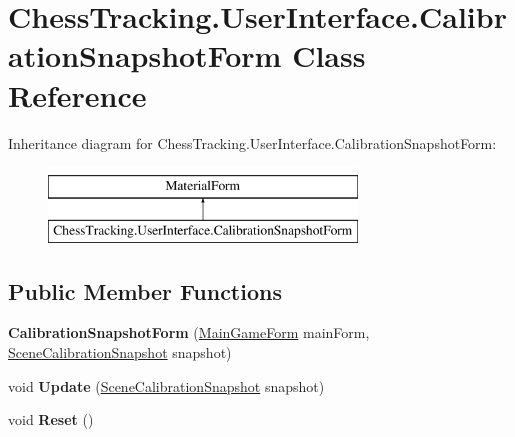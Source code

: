 \hypertarget{class_chess_tracking_1_1_user_interface_1_1_calibration_snapshot_form}{}\section{Chess\+Tracking.\+User\+Interface.\+Calibration\+Snapshot\+Form Class Reference}
\label{class_chess_tracking_1_1_user_interface_1_1_calibration_snapshot_form}
Inheritance diagram for Chess\+Tracking.\+User\+Interface.\+Calibration\+Snapshot\+Form\+:\begin{figure}[H]
\begin{center}
\leavevmode
\includegraphics[height=2.000000cm]{class_chess_tracking_1_1_user_interface_1_1_calibration_snapshot_form}
\end{center}
\end{figure}
\subsection*{Public Member Functions}
\begin{DoxyCompactItemize}
\item 
\mbox{\label{class_chess_tracking_1_1_user_interface_1_1_calibration_snapshot_form_a52eefbac31ece28eccabee022dd09ae3}} 
{\bfseries Calibration\+Snapshot\+Form} (\mbox{\hyperlink{class_chess_tracking_1_1_user_interface_1_1_main_game_form}{Main\+Game\+Form}} main\+Form, \mbox{\hyperlink{class_chess_tracking_1_1_image_processing_1_1_pipeline_data_1_1_scene_calibration_snapshot}{Scene\+Calibration\+Snapshot}} snapshot)
\item 
\mbox{\label{class_chess_tracking_1_1_user_interface_1_1_calibration_snapshot_form_a0495d4fb7b3d358abee7aa709c13580d}} 
void {\bfseries Update} (\mbox{\hyperlink{class_chess_tracking_1_1_image_processing_1_1_pipeline_data_1_1_scene_calibration_snapshot}{Scene\+Calibration\+Snapshot}} snapshot)
\item 
\mbox{\label{class_chess_tracking_1_1_user_interface_1_1_calibration_snapshot_form_ad5d35f754b92de960c5264e6eb730f68}} 
void {\bfseries Reset} ()
\end{DoxyCompactItemize}
